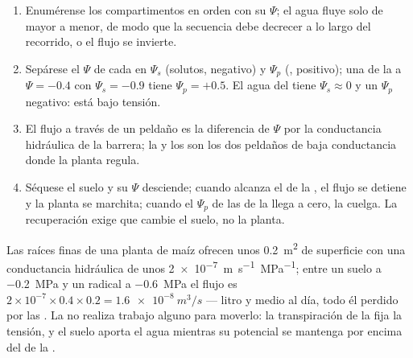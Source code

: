 \begin{method}\label{met:b1:plant-water-minerals:profile}
\begin{enumerate}
  \item Enumérense los compartimentos en orden con su $\Psi$; el agua fluye
        solo de mayor a menor, de modo que la secuencia debe decrecer a lo
        largo del recorrido, o el flujo se invierte.
  \item Sepárese el $\Psi$ de cada  en $\Psi_s$ (solutos, negativo) y
        $\Psi_p$ (, positivo); una  de la  a $\Psi = -0.4$ con $\Psi_s = -0.9$ tiene $\Psi_p = +0.5$. El agua del 
        tiene $\Psi_s \approx 0$ y un $\Psi_p$ negativo: está bajo tensión.
  \item El flujo a través de un peldaño es la diferencia de $\Psi$ por la
        conductancia hidráulica de la barrera; la  y los 
        son los dos peldaños de baja conductancia donde la planta regula.
  \item Séquese el suelo y su $\Psi$ desciende; cuando alcanza el de la
        , el flujo se detiene y la planta se marchita; cuando el
        $\Psi_p$ de las  de la  llega a cero, la  cuelga. La
        recuperación exige que cambie el suelo, no la planta.
\end{enumerate}
\end{method}

\begin{example}\label{ex:b1:plant-water-minerals:litre}
Las raíces finas de una planta de maíz ofrecen unos \qty{0.2}{m^2} de
superficie con una conductancia hidráulica de unos
\qty{2e-7}{m.s^{-1}.MPa^{-1}}; entre un suelo a \qty{-0.2}{MPa} y un 
radical a \qty{-0.6}{MPa} el flujo es $2\times 10^{-7}\times 0.4\times 0.2 = \qty{1.6e-8}{m^3/s}$ --- litro y medio al día, todo él perdido por las
. La  no realiza trabajo alguno para moverlo: la transpiración de
la  fija la tensión, y el suelo aporta el agua mientras su potencial se
mantenga por encima del de la .
\end{example}

